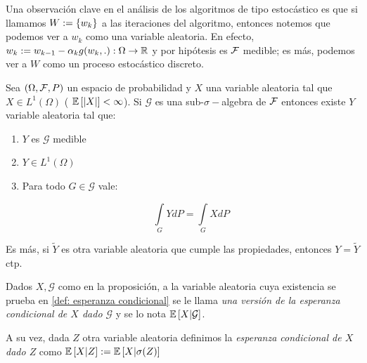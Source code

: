\begin{remark}
	Una observaci\'on clave en el an\'alisis de los algoritmos de tipo estoc\'astico es que si llamamos ${W} := \left\lbrace w_k\right\rbrace$ a las iteraciones del algoritmo, entonces notemos que podemos ver a $w_k$ como una variable aleatoria. En efecto, $w_k := w_{k-1} - \alpha_k g(w_k, .) : \Omega \rightarrow {\mathbb{R}}$ y por hip\'otesis es $\mathcal{F}$ medible; es m\'as, podemos ver a $W$ como un proceso estoc\'astico discreto.
\end{remark}

\begin{proposition}
	\label{def: esperanza condicional}
	Sea $\left(\Omega, \mathcal{F}, P\right)$ un espacio de probabilidad y $X$ una variable aleatoria tal que $X \in L^1(\Omega)$ ( \Eg $\mathbb{E} \left[\left\lvert X\right\rvert\right] < \infty$). Si $\mathcal{G}$ es una sub-$\sigma-$algebra de $\mathcal{F}$ entonces existe $Y$ variable aleatoria tal que:
	
	\begin{enumerate}
		\item $Y$ es $\mathcal{G}$ medible
		\item $Y \in L^1(\Omega)$
		\item Para todo $G \in \mathcal{G}$ vale:
		
		\begin{equation*}
			\int\limits_{G} {Y dP} = \int\limits_{G} {X dP}
		\end{equation*}
	\end{enumerate}

	Es m\'as, si $\widetilde{Y}$ es otra variable aleatoria que cumple las propiedades, entonces $Y = \widetilde{Y}$ ctp.
	
\end{proposition}

\begin{definition}
	Dados $X,\mathcal{G}$ como en la proposici\'on, a la variable aleatoria cuya existencia se prueba en \ref{def: esperanza condicional} se le llama \textit{una versi\'on de la esperanza condicional de $X$ dado $\mathcal{G}$} y se lo nota $\mathbb{E} \left[X \vert \mathcal{G}\right]$.
	
	A su vez, dada $Z$ otra variable aleatoria definimos la \textit{esperanza condicional de $X$ dado $Z$} como $\mathbb{E} \left[X \vert Z\right] := \mathbb{E} \left[X \vert \sigma(Z)\right]$
	
\end{definition}

